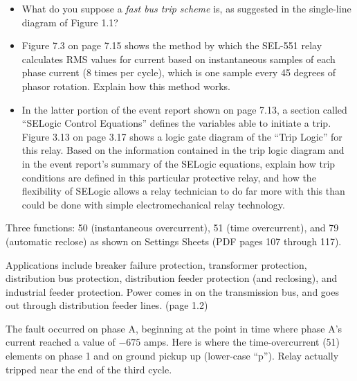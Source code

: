 \begin{itemize}
\item{} What do you suppose a {\it fast bus trip scheme} is, as suggested in the single-line diagram of Figure 1.1?
\item{} Figure 7.3 on page 7.15 shows the method by which the SEL-551 relay calculates RMS values for current based on instantaneous samples of each phase current (8 times per cycle), which is one sample every 45 degrees of phasor rotation.  Explain how this method works.
\item{} In the latter portion of the event report shown on page 7.13, a section called ``SELogic Control Equations'' defines the variables able to initiate a trip.  Figure 3.13 on page 3.17 shows a logic gate diagram of the ``Trip Logic'' for this relay.  Based on the information contained in the trip logic diagram and in the event report's summary of the SELogic equations, explain how trip conditions are defined in this particular protective relay, and how the flexibility of SELogic allows a relay technician to do far more with this than could be done with simple electromechanical relay technology. 
\end{itemize}















Three functions: 50 (instantaneous overcurrent), 51 (time overcurrent), and 79 (automatic reclose) as shown on Settings Sheets (PDF pages 107 through 117).



\vskip 10pt

Applications include breaker failure protection, transformer protection, distribution bus protection, distribution feeder protection (and reclosing), and industrial feeder protection.   Power comes in on the transmission bus, and goes out through distribution feeder lines. (page 1.2)

\vskip 10pt

The fault occurred on phase A, beginning at the point in time where phase A's current reached a value of $-675$ amps.  Here is where the time-overcurrent (51) elements on phase 1 and on ground pickup up (lower-case ``p'').  Relay actually tripped near the end of the third cycle.

